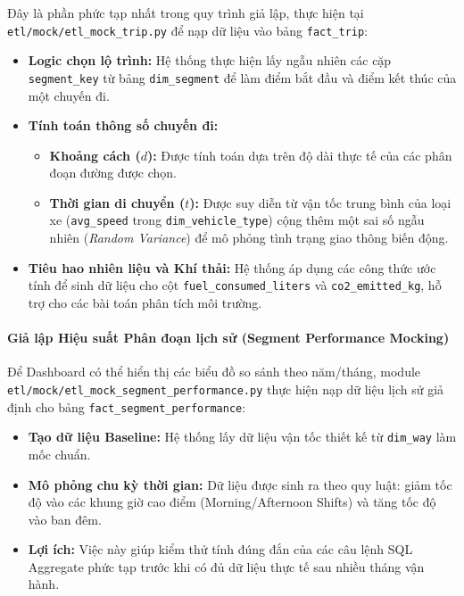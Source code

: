 Đây là phần phức tạp nhất trong quy trình giả lập, thực hiện tại \texttt{etl/mock/etl\_mock\_trip.py} để nạp dữ liệu vào bảng \texttt{fact\_trip}:
\begin{itemize}
    \item \textbf{Logic chọn lộ trình:} Hệ thống thực hiện lấy ngẫu nhiên các cặp \texttt{segment\_key} từ bảng \texttt{dim\_segment} để làm điểm bắt đầu và điểm kết thúc của một chuyến đi.
    \item \textbf{Tính toán thông số chuyến đi:}
    \begin{itemize}
        \item \textbf{Khoảng cách ($d$):} Được tính toán dựa trên độ dài thực tế của các phân đoạn đường được chọn.
        \item \textbf{Thời gian di chuyển ($t$):} Được suy diễn từ vận tốc trung bình của loại xe (\texttt{avg\_speed} trong \texttt{dim\_vehicle\_type}) cộng thêm một sai số ngẫu nhiên (\textit{Random Variance}) để mô phỏng tình trạng giao thông biến động.
    \end{itemize}
    \item \textbf{Tiêu hao nhiên liệu và Khí thải:} Hệ thống áp dụng các công thức ước tính để sinh dữ liệu cho cột \texttt{fuel\_consumed\_liters} và \texttt{co2\_emitted\_kg}, hỗ trợ cho các bài toán phân tích môi trường.
\end{itemize}

\paragraph{ Giả lập Hiệu suất Phân đoạn lịch sử (Segment Performance Mocking)}

Để Dashboard có thể hiển thị các biểu đồ so sánh theo năm/tháng, module \texttt{etl/mock/etl\_mock\_segment\_performance.py} thực hiện nạp dữ liệu lịch sử giả định cho bảng \texttt{fact\_segment\_performance}:
\begin{itemize}
    \item \textbf{Tạo dữ liệu Baseline:} Hệ thống lấy dữ liệu vận tốc thiết kế từ \texttt{dim\_way} làm mốc chuẩn.
    \item \textbf{Mô phỏng chu kỳ thời gian:} Dữ liệu được sinh ra theo quy luật: giảm tốc độ vào các khung giờ cao điểm (Morning/Afternoon Shifts) và tăng tốc độ vào ban đêm.
    \item \textbf{Lợi ích:} Việc này giúp kiểm thử tính đúng đắn của các câu lệnh SQL Aggregate phức tạp trước khi có đủ dữ liệu thực tế sau nhiều tháng vận hành.
\end{itemize}

